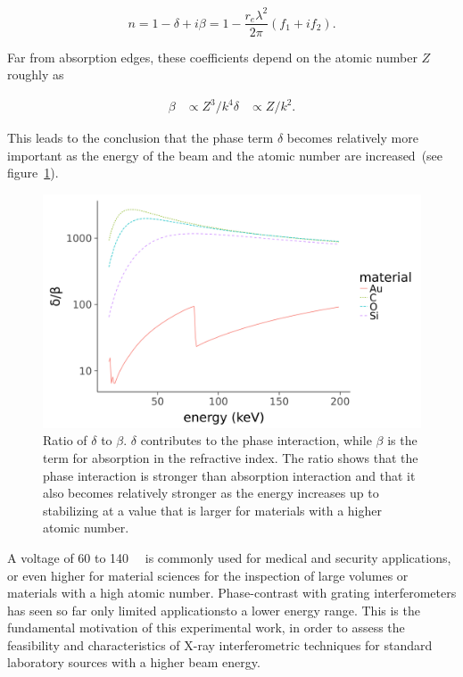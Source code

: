 \begin{equation}
    n = 1 - \delta + i\beta = 1 - \frac{r_e\lambda^2}{2\pi}(f_1 + if_2).
    \label{eq:atom.factors}
\end{equation}

Far from absorption edges, these coefficients depend on the atomic number
$Z$ roughly as~\cite{knoll2000radiation,Momose2005}

\begin{align}
    \beta &\propto Z^3 / k^4
    \delta &\propto Z / k^2.
    \label{eq:delta.beta.energy}
\end{align}

This leads to the conclusion that the phase term $\delta$ becomes
relatively more important as the energy of the beam and the atomic number
are increased~(see figure~\ref{fig:delta.beta}).

\begin{figure}[htb]
    \centering
    \includegraphics[width=\textwidth]{gfx/delta-beta-comparison/delta-beta-comparison.png}
    \caption[Values of $\delta/\beta$ as a function of energy for different
    materials.]{Ratio of $\delta$ to $\beta$. $\delta$ contributes to the
    phase interaction, while $\beta$ is the term for absorption in the
refractive index. The ratio shows that the phase interaction is stronger
than absorption interaction and that it also becomes relatively stronger as
the energy increases up to stabilizing at a value that is larger for
materials with a higher atomic number.}
    \label{fig:delta.beta}
\end{figure}


A voltage of 60 to \SI{140}{\kilo\voltpeak} is commonly used for medical and
security applications, or even higher for material sciences for the
inspection of large volumes or materials with a high atomic number.
Phase-contrast with grating interferometers has seen so far only limited
applications\cn to a lower energy range.
This is the fundamental motivation of this experimental work, in order to
assess the feasibility and characteristics of X-ray interferometric
techniques for standard laboratory sources with a higher beam energy.

